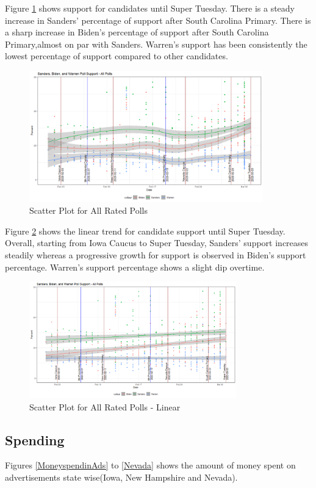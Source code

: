 Figure \ref{scatter-all} shows support for candidates until Super Tuesday. There is a steady increase in Sanders' percentage of support after South Carolina Primary. There is a sharp increase in Biden's percentage of support after South Carolina Primary,almost on par with Sanders. Warren's support has been consistently the lowest percentage of support compared to other candidates. 
\begin{figure}[H]
    \centering
    \includegraphics[width=0.9\textwidth]{figures/scatter-all.png}
    \caption{Scatter Plot for All Rated Polls}
    \label{scatter-all}
\end{figure}
Figure \ref{scatter-all-linear} shows the linear trend for candidate support until Super Tuesday. Overall, starting from Iowa Caucus to Super Tuesday, Sanders' support increases steadily whereas a progressive growth for support is observed in Biden's support percentage. Warren's support percentage shows a slight dip overtime.
\begin{figure}[H]
    \centering
    \includegraphics[width=0.8\textwidth]{figures/scatter-all-linear.png}
    \caption{Scatter Plot for All Rated Polls - Linear}
    \label{scatter-all-linear}
\end{figure}

\subsection{Spending}
Figures \ref{MoneyspendinAds} to \ref{Nevada} shows the amount of money spent on advertisements state wise(Iowa, New Hampshire and Nevada). 

